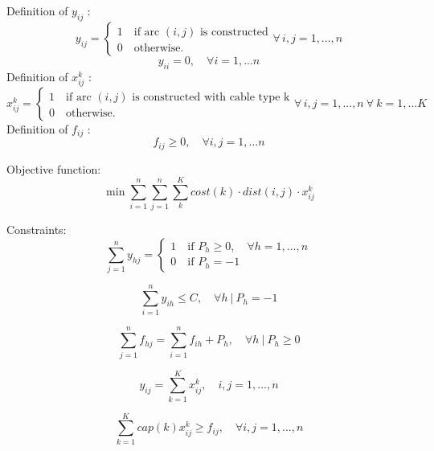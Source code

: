 Definition of $y_{ij}$ :
\[
	y_{ij} =
   \begin{cases}
   1 \quad \mbox{if arc } (i,j) \mbox{ is constructed} \\
   0 \quad \mbox{otherwise.} 
   \end{cases}
   \forall \,i,j = 1, ..., n 
\]
\[
	y_{ii} = 0, \quad \forall i= 1, ... n 
\]
Definition of $x^k_{ij}$ :
\[
	x^k_{ij} =
   \begin{cases}
   1 \quad \mbox{if arc } (i,j) \mbox{ is constructed with cable type k} \\
   0 \quad \mbox{otherwise.} 
   \end{cases}
   \forall \,i,j = 1, ..., n \ \forall \ k = 1,... K
\]
Definition of $f_{ij}$ :
\[
	f_{ij} \geq 0, \quad \forall i,j= 1, ... n
\]

Objective function: 
\begin{equation}\label{eq:obj}
	\min{\sum^n_{i=1} \sum^n_{j=1} \sum^K_{k} cost(k) \cdot dist(i,j) \cdot x^k_{ij}}
\end{equation}

Constraints: 
\begin{equation}\label{eq:numberCable}
	\sum^n_{j = 1} y_{hj} = 
	\begin{cases}
   1 \quad \mbox{if } P_h \geq 0, \quad \forall h=1,...,n \\
   0 \quad \mbox{if } P_h = -1
   \end{cases}
\end{equation}

\begin{equation}\label{eq:basestation}
	\sum^n_{i =1} y_{ih} \leq C, \quad \forall h \ | \ P_h = -1
\end{equation}

\begin{equation}\label{eq:flux}
	\sum^n_{j=1} f_{hj} = \sum^n_{i=1} f_{ih}+ P_h, \quad \forall h \ | \ P_h \geq 0
\end{equation}

\begin{equation}\label{eq:oneCable}
	y_{ij} = \sum^K_{k=1} x^k_{ij}, \quad i,j = 1,...,n
\end{equation}

\begin{equation}\label{eq:capacity}
	\sum^K_{k=1} cap(k)x^k_{ij} \geq f_{ij}, \quad \forall i,j = 1,...,n
\end{equation}

